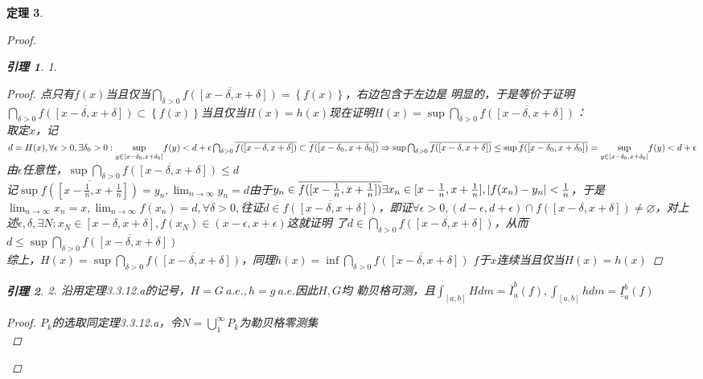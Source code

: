 \documentclass[12pt, a4paper, oneside]{ctexbook}
\newtheorem{theorem}{定理}[section]
\newtheorem{lemma}[theorem]{引理}
\begin{document}
\begin{theorem}
\begin{proof}
\begin{lemma}{1.}
\begin{proof}
                点只有$f(x)$当且仅当$\bigcap_{\delta>0}\overline{f([x-\delta,x+\delta])}=\left\{f(x)\right\}$，右边包含于左边是
                明显的，于是等价于证明$\bigcap_{\delta>0}\overline{f([x-\delta,x+\delta])}\subset\left\{f(x)\right\}$当且仅当$H(x)=
                h(x)$现在证明$H(x)=\sup\bigcap_{\delta>0}\overline{f([x-\delta,x+\delta])}$：\\
                取定$x$，记$d=H(x),\forall \epsilon>0,\exists \delta_0>0:\underset{y\in[x-\delta_0,x+\delta_0]}{\sup}f(y)<d+\epsilon\\
                \bigcap_{\delta>0}\overline{f([x-\delta,x+\delta])}\subset \overline{f([x-\delta_0,x+\delta_0])}\Rightarrow \sup\bigcap_{\delta>0}\overline{f([x-\delta,x+\delta])}\leq
                \sup\overline{f([x-\delta_0,x+\delta_0])}=\underset{y\in[x-\delta_0,x+\delta_0]}{\sup}f(y)<d+\epsilon$\\
                由$\epsilon$任意性，$\sup\bigcap_{\delta>0}\overline{f([x-\delta,x+\delta])}\leq d$\\
                记$\sup\overline{f([x-\frac{1}{n},x+\frac{1}{n}])}=y_n,\lim_{n\to\infty}y_n=d$由于$y_n\in\overline{f([x-\frac{1}{n},x+\frac{1}{n}])}\\
                \exists x_n\in[x-\frac{1}{n},x+\frac{1}{n}],|f(x_n)-y_n|<\frac{1}{n}$，于是$\lim_{n\to\infty}x_n=x,\lim_{n\to\infty}f(x_n)=
                d,\forall \delta>0,$往证$d\in\overline{f([x-\delta,x+\delta])}$，即证$\forall \epsilon>0,(d-\epsilon,d+\epsilon)\cap f([x-\delta,x+
                \delta])\neq\varnothing$，对上述$\epsilon,\delta,\exists N:x_N\in[x-\delta,x+\delta],f(x_N)\in(x-\epsilon,x+\epsilon)$这就证明
                了$d\in\bigcap_{\delta>0}\overline{f([x-\delta,x+\delta])}$，从而$d\leq\sup\bigcap_{\delta>0}\overline{f([x-\delta,x+\delta])}$\\
                综上，$H(x)=\sup\bigcap_{\delta>0}\overline{f([x-\delta,x+\delta])}$，同理$h(x)=\inf\bigcap_{\delta>0}\overline{f([x-\delta,x+\delta])}$
                $f$于$x$连续当且仅当$H(x)=h(x)$
            \end{proof}
        \end{lemma}
        \begin{lemma}{2.}
            沿用定理3.3.12.a的记号，$H=G\ a.e.,h=g\ a.e.$因此$H,G$均
            勒贝格可测，且$\int_{[a,b]}Hdm=\overline{I}_a^b(f),\int_{[a,b]}hdm=\underline{I}_a^b(f)$
            \begin{proof}
                $P_k$的选取同定理3.3.12.a，令$N=\bigcup_1^{\infty}P_k$为勒贝格零测集\\

\end{proof}
\end{lemma}
\end{proof}
\end{theorem}
\end{document}
